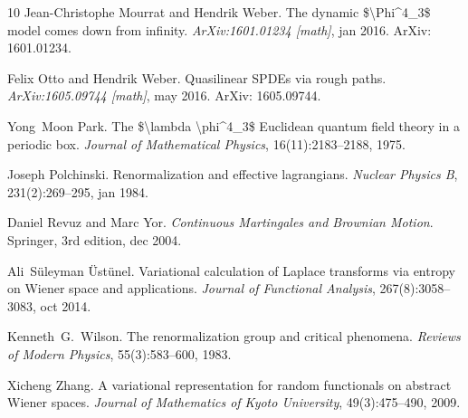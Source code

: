 \documentclass[11pt, oneside]{article}   	%
\newcommand{\tmtextit}[1]{{\itshape{#1}}}
\begin{document}
\begin{thebibliography}{10}
  Jean-Christophe Mourrat  and  Hendrik
  Weber. {\newblock}The dynamic \$\textbackslash Phi{\textasciicircum}4\_3\$
  model comes down from infinity. {\newblock}\tmtextit{ArXiv:1601.01234
  [math]}, jan 2016. {\newblock}ArXiv: 1601.01234.{\newblock}
  
  Felix Otto  and  Hendrik Weber.
  {\newblock}Quasilinear SPDEs via rough paths.
  {\newblock}\tmtextit{ArXiv:1605.09744 [math]}, may 2016. {\newblock}ArXiv:
  1605.09744.{\newblock}
  
  Yong~Moon Park. {\newblock}The
  \$\textbackslash lambda \textbackslash phi{\textasciicircum}4\_3\$ Euclidean
  quantum field theory in a periodic box. {\newblock}\tmtextit{Journal of
  Mathematical Physics}, 16(11):2183--2188, 1975.{\newblock}
  
  Joseph Polchinski.
  {\newblock}Renormalization and effective lagrangians.
  {\newblock}\tmtextit{Nuclear Physics B}, 231(2):269--295, jan
  1984.{\newblock}
  
  Daniel Revuz  and  Marc Yor.
  {\newblock}\tmtextit{Continuous Martingales and Brownian Motion}.
  {\newblock}Springer, 3rd  edition, dec 2004.{\newblock}
  
  Ali~S{\"u}leyman {\"U}st{\"u}nel.
  {\newblock}Variational calculation of Laplace transforms via entropy on
  Wiener space and applications. {\newblock}\tmtextit{Journal of Functional
  Analysis}, 267(8):3058--3083, oct 2014.{\newblock}
  
  Kenneth~G.~Wilson. {\newblock}The
  renormalization group and critical phenomena. {\newblock}\tmtextit{Reviews
  of Modern Physics}, 55(3):583--600, 1983.{\newblock}
  
  Xicheng Zhang. {\newblock}A variational
  representation for random functionals on abstract Wiener spaces.
  {\newblock}\tmtextit{Journal of Mathematics of Kyoto University},
  49(3):475--490, 2009.{\newblock}
\end{thebibliography}
\end{document}
